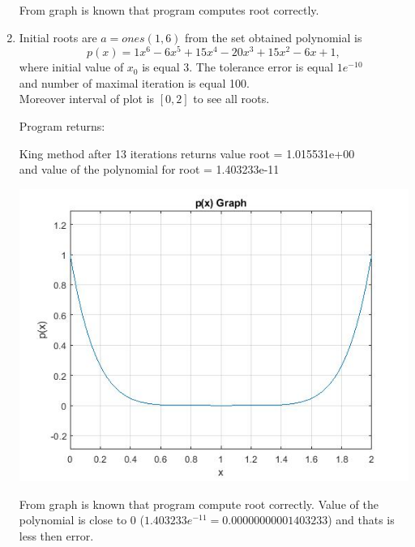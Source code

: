 \documentclass[12pt]{article}
\begin{document}
\begin{enumerate}
From graph is known that program computes root correctly.

\vskip50pt

\item

Initial roots are $a=ones(1,6)$ from the set obtained polynomial is\\
\begin{equation*}
p(x)=1x^6    -6x^5    +15x^4   -20x^3    +15x^2    -6x     +1,
\end{equation*}
where initial value of $x_{0}$ is equal 3.
The tolerance error is equal $1e^{-10}$ \\and number of maximal iteration is equal 100.
\\Moreover interval of plot is $[0,2]$ to see all roots. 

\vskip20pt

Program returns:
\begin{center}
King method after 13 iterations returns value root = 1.015531e+00\\
and value of the polynomial for root = 1.403233e-11
\end{center}

\begin{center}
   \includegraphics[scale=0.6]{Example_2.jpg}
\end{center}

From graph is known that program compute root correctly. Value of the polynomial is close to 0 ($1.403233e^{-11} = 0.00000000001403233$) and thats is less then error.


\vskip50pt


\end{enumerate}
\end{document}
